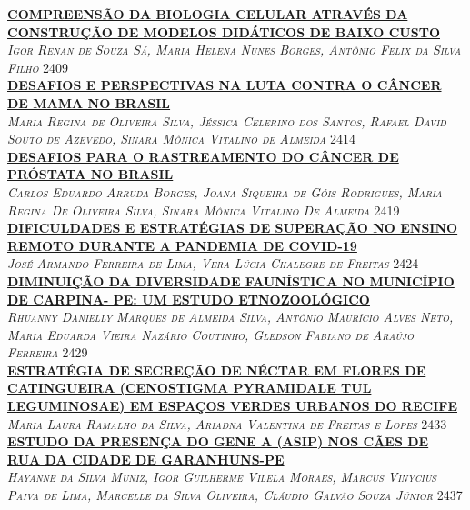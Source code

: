 \noindent \textsc{\hyperlink{trabalhos/249836.pdf.1}{\textbf{COMPREENSÃO DA BIOLOGIA CELULAR ATRAVÉS DA CONSTRUÇÃO DE MODELOS DIDÁTICOS DE BAIXO CUSTO}}}\\ 
\noindent \textsc{\textit{Igor Renan de Souza Sá, Maria Helena Nunes Borges, Antônio Felix da Silva Filho}} \hfill 2409\\ 

\noindent \textsc{\hyperlink{trabalhos/247999.pdf.1}{\textbf{DESAFIOS E PERSPECTIVAS NA LUTA CONTRA O CÂNCER DE MAMA NO BRASIL}}}\\ 
\noindent \textsc{\textit{Maria Regina de Oliveira Silva, Jéssica Celerino dos Santos, Rafael David Souto de Azevedo, Sinara Mônica Vitalino de Almeida}} \hfill 2414\\ 

\noindent \textsc{\hyperlink{trabalhos/251531.pdf.1}{\textbf{DESAFIOS PARA O RASTREAMENTO DO CÂNCER DE PRÓSTATA NO BRASIL}}}\\ 
\noindent \textsc{\textit{Carlos Eduardo Arruda Borges, Joana Siqueira de Góis Rodrigues, Maria Regina De Oliveira Silva, Sinara Mônica Vitalino De Almeida}} \hfill 2419\\ 

\noindent \textsc{\hyperlink{trabalhos/245111.pdf.1}{\textbf{DIFICULDADES E ESTRATÉGIAS DE SUPERAÇÃO NO ENSINO REMOTO DURANTE A PANDEMIA DE COVID-19}}}\\ 
\noindent \textsc{\textit{José Armando Ferreira de Lima, Vera Lúcia Chalegre de Freitas}} \hfill 2424\\ 

\noindent \textsc{\hyperlink{trabalhos/250155.pdf.1}{\textbf{DIMINUIÇÃO DA DIVERSIDADE FAUNÍSTICA NO MUNICÍPIO DE CARPINA- PE: UM ESTUDO ETNOZOOLÓGICO}}}\\ 
\noindent \textsc{\textit{Rhuanny Danielly Marques de Almeida Silva, Antônio Maurício Alves Neto, Maria Eduarda Vieira Nazário Coutinho, Gledson Fabiano de Araújo Ferreira}} \hfill 2429\\ 

\noindent \textsc{\hyperlink{trabalhos/251570.pdf.1}{\textbf{ESTRATÉGIA DE SECREÇÃO DE NÉCTAR EM FLORES DE CATINGUEIRA (CENOSTIGMA PYRAMIDALE TUL LEGUMINOSAE) EM ESPAÇOS VERDES URBANOS DO RECIFE}}}\\ 
\noindent \textsc{\textit{Maria Laura Ramalho da Silva, Ariadna Valentina de Freitas e Lopes}} \hfill 2433\\ 

\noindent \textsc{\hyperlink{trabalhos/251653.pdf.1}{\textbf{ESTUDO DA PRESENÇA DO GENE A (ASIP) NOS CÃES DE RUA DA CIDADE DE GARANHUNS-PE}}}\\ 
\noindent \textsc{\textit{Hayanne da Silva Muniz, Igor Guilherme Vilela Moraes, Marcus Vinycius Paiva de Lima, Marcelle da Silva Oliveira, Cláudio Galvão Souza Júnior}} \hfill 2437\\ 

